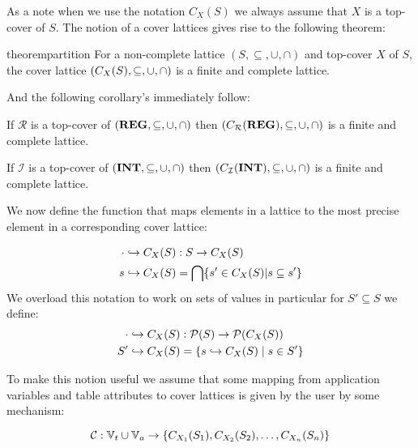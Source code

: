 As a note when we use the notation $C_X(S)$ we always assume that $X$ is a top-cover of $S$.
The notion of a cover lattices gives rise to the following theorem:

\begin{restatable}{theorem}{partition}\label{thm:partition}
For a non-complete lattice $(S, \subseteq, \cup, \cap)$ and top-cover $X$ of $S$, the cover lattice $(C_{X}(S), \subseteq, \cup, \cap)$ is a finite and complete lattice.
\end{restatable}

And the following corollary's immediately follow:

\begin{corollary}
    If $\mathcal{R}$ is a top-cover of $(\mathbf{REG}, \subseteq, \cup, \cap)$ then $(C_{\mathcal{R}}(\mathbf{REG}), \subseteq, \cup, \cap)$ is a finite and complete lattice.
\end{corollary}

\begin{corollary}
    If $\mathcal{I}$ is a top-cover of $(\mathbf{INT}, \subseteq, \cup, \cap)$ then $(C_{\mathcal{I}}(\mathbf{INT}), \subseteq, \cup, \cap)$ is a finite and complete lattice.
\end{corollary}

We now define the function that maps elements in a lattice to the most precise element in a corresponding cover lattice:

\begin{align}
    \cdot \hookrightarrow C_X(S) &: S\rightarrow C_X(S) \\
    s \hookrightarrow C_X(S) &= \bigcap\{s' \in C_X(S)|s \subseteq s'\}
\end{align}
We overload this notation to work on sets of values in particular for $S' \subseteq S$ we define:
\begin{align}
    \cdot \hookrightarrow C_X(S) &: \mathcal{P}(S) \rightarrow \mathcal{P}(C_X(S)) \\
    S' \hookrightarrow C_X (S) &= \{s \hookrightarrow C_X(S) \mid s \in S'\}
\end{align}

To make this notion useful we assume that some mapping from application variables and table attributes to cover lattices is given by the user by some mechanism:

\begin{equation}\label{eq:lookupcl}
    \lookupcl : \mathbb{V}_t \cup \mathbb{V}_a \rightarrow \{ C_{X_1}(S_1), C_{X_2}(S_2), \dots, C_{X_n}(S_n) \}
\end{equation}


